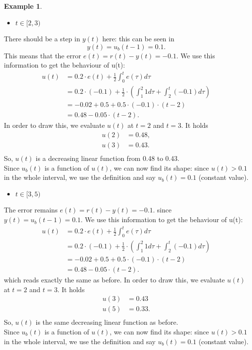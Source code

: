 \documentclass[a4paper,12 pt]{article}
\numberwithin{equation}{section}
\theoremstyle{definition}
\newtheorem{bsp}{Example}
\theoremstyle{remark}
\theoremstyle{definition}
\theoremstyle{definition}
\theoremstyle{definition}
\theoremstyle{remark}
\begin{document}
\begin{bsp}
\begin{itemize}
\item $t\in [2,3)$
\end{itemize}
There should be a step in $y(t)$ here: this can be seen in 
$$y(t)=u_b(t-1)=0.1.$$
This means that the error $e(t)=r(t)-y(t)=-0.1.$ We use this information to get the behaviour of u(t):
\begin{equation*}
\begin{split}
u(t)&=0.2\cdot e(t) +\frac{1}{2} \int_0^te(\tau)d\tau\\
&=0.2\cdot (-0.1) + \frac{1}{2} \cdot \left(\int_1^2 1 d \tau + \int_2^t (-0.1) d \tau\right)\\
&= -0.02+ 0.5+ 0.5 \cdot (-0.1)\cdot (t-2)\\
&=0.48-0.05\cdot (t-2).
\end{split}
\end{equation*}
In order to draw this, we evaluate $u(t)$ at $t=2$ and $t=3$. It holds
\begin{equation*}
\begin{split}
u(2)&=0.48,\\
u(3)&=0.43.\\
\end{split}
\end{equation*}
So, $u(t)$ is a decreasing linear function from 0.48 to 0.43. \\
Since $u_b(t)$ is a function of $u(t)$, we can now find its shape: since $u(t)>0.1$ in the whole interval, we use the definition and say $u_b(t)=0.1$ (constant value).
\begin{itemize}
\item $t\in [3,5)$
\end{itemize}
The error remains $e(t)=r(t)-y(t)=-0.1.$ since $y(t)=u_b(t-1)=0.1$. We use this information to get the behaviour of u(t):
\begin{equation*}
\begin{split}
u(t)&=0.2\cdot e(t) +\frac{1}{2} \int_0^te(\tau)d\tau\\
&=0.2\cdot (-0.1) + \frac{1}{2} \cdot \left(\int_1^2 1 d \tau + \int_2^t (-0.1) d \tau\right)\\
&= -0.02+ 0.5+ 0.5 \cdot (-0.1)\cdot (t-2)\\
&=0.48-0.05\cdot (t-2).
\end{split}
\end{equation*}
which reads exactly the same as before. In order to draw this, we evaluate $u(t)$ at $t=2$ and $t=3$. It holds
\begin{equation*}
\begin{split}
u(3)&=0.43\\
u(5)&=0.33.\\
\end{split}
\end{equation*}
So, $u(t)$ is the same decreasing linear function as before. \\ Since $u_b(t)$ is a function of $u(t)$, we can now find its shape: since $u(t)>0.1$ in the whole interval, we use the definition and say $u_b(t)=0.1$ (constant value).



\end{bsp}
\end{document}
